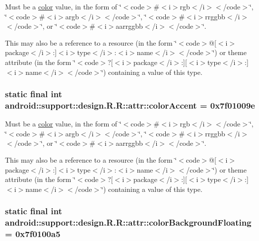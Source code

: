 Must be a \hyperlink{classandroid_1_1support_1_1design_1_1_r_1_1color}{color} value, in the form of \char`\"{}$<$code$>$\#$<$i$>$rgb$<$/i$>$$<$/code$>$\char`\"{}, \char`\"{}$<$code$>$\#$<$i$>$argb$<$/i$>$$<$/code$>$\char`\"{}, \char`\"{}$<$code$>$\#$<$i$>$rrggbb$<$/i$>$$<$/code$>$\char`\"{}, or \char`\"{}$<$code$>$\#$<$i$>$aarrggbb$<$/i$>$$<$/code$>$\char`\"{}. 

This may also be a reference to a resource (in the form \char`\"{}$<$code$>$@\mbox{[}$<$i$>$package$<$/i$>$:\mbox{]}$<$i$>$type$<$/i$>$:$<$i$>$name$<$/i$>$$<$/code$>$\char`\"{}) or theme attribute (in the form \char`\"{}$<$code$>$?\mbox{[}$<$i$>$package$<$/i$>$:\mbox{]}\mbox{[}$<$i$>$type$<$/i$>$:\mbox{]}$<$i$>$name$<$/i$>$$<$/code$>$\char`\"{}) containing a value of this type. \hypertarget{classandroid_1_1support_1_1design_1_1_r_1_1attr_ddce9093ad2018bb92e94c9ded041113}{
\subsubsection[{colorAccent}]{\setlength{\rightskip}{0pt plus 5cm}static final int android::support::design.R.R::attr::colorAccent = 0x7f01009e}}
\label{classandroid_1_1support_1_1design_1_1_r_1_1attr_ddce9093ad2018bb92e94c9ded041113}


Must be a \hyperlink{classandroid_1_1support_1_1design_1_1_r_1_1color}{color} value, in the form of \char`\"{}$<$code$>$\#$<$i$>$rgb$<$/i$>$$<$/code$>$\char`\"{}, \char`\"{}$<$code$>$\#$<$i$>$argb$<$/i$>$$<$/code$>$\char`\"{}, \char`\"{}$<$code$>$\#$<$i$>$rrggbb$<$/i$>$$<$/code$>$\char`\"{}, or \char`\"{}$<$code$>$\#$<$i$>$aarrggbb$<$/i$>$$<$/code$>$\char`\"{}. 

This may also be a reference to a resource (in the form \char`\"{}$<$code$>$@\mbox{[}$<$i$>$package$<$/i$>$:\mbox{]}$<$i$>$type$<$/i$>$:$<$i$>$name$<$/i$>$$<$/code$>$\char`\"{}) or theme attribute (in the form \char`\"{}$<$code$>$?\mbox{[}$<$i$>$package$<$/i$>$:\mbox{]}\mbox{[}$<$i$>$type$<$/i$>$:\mbox{]}$<$i$>$name$<$/i$>$$<$/code$>$\char`\"{}) containing a value of this type. \hypertarget{classandroid_1_1support_1_1design_1_1_r_1_1attr_1e46b5ea42366baf5833a4b961283c85}{
\subsubsection[{colorBackgroundFloating}]{\setlength{\rightskip}{0pt plus 5cm}static final int android::support::design.R.R::attr::colorBackgroundFloating = 0x7f0100a5}}
\label{classandroid_1_1support_1_1design_1_1_r_1_1attr_1e46b5ea42366baf5833a4b961283c85}


